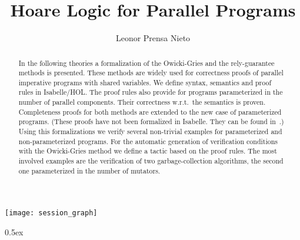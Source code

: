 \documentclass[11pt,a4paper]{report}
\begin{document}
\title{Hoare Logic for Parallel Programs}
\author{Leonor Prensa Nieto}
\maketitle

\begin{abstract}\noindent
  In the following theories a formalization of the Owicki-Gries and
  the rely-guarantee methods is presented. These methods are widely
  used for correctness proofs of parallel imperative programs with
  shared variables.  We define syntax, semantics and proof rules in
  Isabelle/HOL.  The proof rules also provide for programs
  parameterized in the number of parallel components. Their
  correctness w.r.t.\ the semantics is proven.  Completeness proofs
  for both methods are extended to the new case of parameterized
  programs. (These proofs have not been formalized in Isabelle. They
  can be found in~\cite{Prensa-PhD}.)  Using this formalizations we
  verify several non-trivial examples for parameterized and
  non-parameterized programs.  For the automatic generation of
  verification conditions with the Owicki-Gries method we define a
  tactic based on the proof rules.  The most involved examples are the
  verification of two garbage-collection algorithms, the second one
  parameterized in the number of mutators.

\end{abstract}

\pagestyle{plain}
\thispagestyle{empty}
\tableofcontents

\clearpage

\begin{center}
  \texttt{[image: session\_graph]}  
\end{center}

\newpage

\parindent 0pt\parskip 0.5ex


%
%
\end{document}
